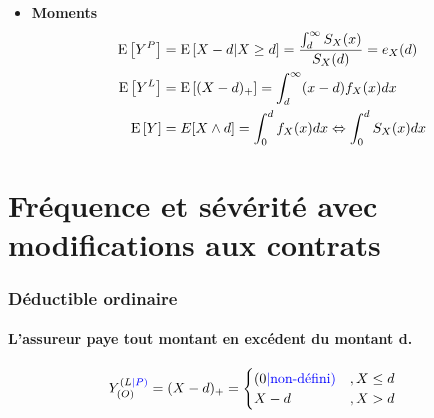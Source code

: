 \documentclass[10pt, french]{article}
\begin{document}
\begin{multicols*}{3}
\begin{itemize}
\item[] \textbf{Moments}
\begin{align*}
	\mathrm{E} \left[ Y^P \right] &= \mathrm{E} \left[ X-d | X \geq d \right] = \frac{\int_{d}^{\infty} S_X(x)}{S_X(d)} = e_X(d) \\
	\mathrm{E} \left[ Y^L \right] &= \mathrm{E} \left[ (X - d)_+ \right] = \int_{d}^{\infty} (x - d) f_X(x) dx \\
	\mathrm{E} \left[ Y \right] &= E[X \wedge d] = \int_0^d f_X(x) dx \Leftrightarrow \int_0^d S_X(x) dx
\end{align*}

\end{itemize}

\setcounter{section}{7}
\section{Fréquence et sévérité avec modifications aux contrats}

\subsubsection*{Déductible ordinaire}

\paragraph{L'assureur paye tout montant en excédent du montant d.}
\begin{align*}
Y^{(L\textcolor{blue}{|P)}}_{(O)} &= (X-d)_+ = 
	\begin{cases}
		(0 {\color{blue}{| \text{non-défini})}}		& , X \leq d \\
		X - d	& , X > d \\
	\end{cases} 
\end{align*}


\end{multicols*}
\end{document}
